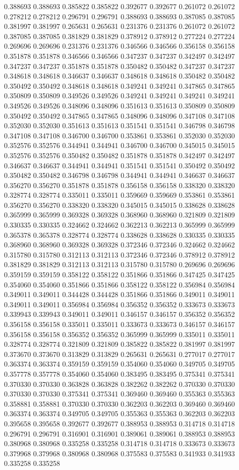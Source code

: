 0.388693 0.388693 0.385822 0.385822 0.392677 0.392677 0.261072 0.261072 0.278212 0.278212 0.296791 0.296791 0.388693 0.388693 0.387085 0.387085 0.381997 0.381997 0.265631 0.265631 0.231376 0.231376 0.261072 0.261072 0.387085 0.387085 0.381829 0.381829 0.378912 0.378912 0.277224 0.277224 0.269696 0.269696 0.231376 0.231376 0.346566 0.346566 0.356158 0.356158 0.351878 0.351878 0.346566 0.346566 0.347237 0.347237 0.342497 0.342497 0.347237 0.347237 0.351878 0.351878 0.350482 0.350482 0.347237 0.347237 0.348618 0.348618 0.346637 0.346637 0.348618 0.348618 0.350482 0.350482 0.350492 0.350492 0.348618 0.348618 0.349241 0.349241 0.347865 0.347865 0.350809 0.350809 0.349526 0.349526 0.349241 0.349241 0.349241 0.349241 0.349526 0.349526 0.348096 0.348096 0.351613 0.351613 0.350809 0.350809 0.350492 0.350492 0.347865 0.347865 0.348096 0.348096 0.347108 0.347108 0.352030 0.352030 0.351613 0.351613 0.351541 0.351541 0.346798 0.346798 0.347108 0.347108 0.346700 0.346700 0.353861 0.353861 0.352030 0.352030 0.352576 0.352576 0.344941 0.344941 0.346700 0.346700 0.345015 0.345015 0.352576 0.352576 0.350482 0.350482 0.351878 0.351878 0.342497 0.342497 0.346637 0.346637 0.344941 0.344941 0.351541 0.351541 0.350492 0.350492 0.350482 0.350482 0.346798 0.346798 0.344941 0.344941 0.346637 0.346637 0.356270 0.356270 0.351878 0.351878 0.356158 0.356158 0.338320 0.338320 0.328774 0.328774 0.335011 0.335011 0.359669 0.359669 0.353861 0.353861 0.356270 0.356270 0.338320 0.338320 0.345015 0.345015 0.338628 0.338628 0.365999 0.365999 0.369328 0.369328 0.368960 0.368960 0.321809 0.321809 0.330335 0.330335 0.324662 0.324662 0.362213 0.362213 0.365999 0.365999 0.365378 0.365378 0.328774 0.328774 0.338628 0.338628 0.330335 0.330335 0.368960 0.368960 0.369328 0.369328 0.372346 0.372346 0.324662 0.324662 0.315780 0.315780 0.312113 0.312113 0.372346 0.372346 0.378912 0.378912 0.381829 0.381829 0.312113 0.312113 0.315780 0.315780 0.269696 0.269696 0.359159 0.359159 0.358122 0.358122 0.351866 0.351866 0.347425 0.347425 0.354060 0.354060 0.351866 0.351866 0.358122 0.358122 0.356984 0.356984 0.349011 0.349011 0.344428 0.344428 0.351866 0.351866 0.349011 0.349011 0.349011 0.349011 0.356984 0.356984 0.356352 0.356352 0.333673 0.333673 0.339943 0.339943 0.349011 0.349011 0.346157 0.346157 0.356352 0.356352 0.356158 0.356158 0.335011 0.335011 0.333673 0.333673 0.346157 0.346157 0.356158 0.356158 0.356352 0.356352 0.365999 0.365999 0.335011 0.335011 0.328774 0.328774 0.321809 0.321809 0.385822 0.385822 0.381997 0.381997 0.373670 0.373670 0.313829 0.313829 0.265631 0.265631 0.277017 0.277017 0.363374 0.363374 0.359159 0.359159 0.354060 0.354060 0.349705 0.349705 0.357778 0.357778 0.354060 0.354060 0.383495 0.383495 0.375341 0.375341 0.370330 0.370330 0.363828 0.363828 0.382262 0.382262 0.370330 0.370330 0.370330 0.370330 0.375341 0.375341 0.369460 0.369460 0.355363 0.355363 0.358881 0.358881 0.370330 0.370330 0.362203 0.362203 0.369460 0.369460 0.363374 0.363374 0.349705 0.349705 0.355363 0.355363 0.362203 0.362203 0.395658 0.395658 0.392677 0.392677 0.388953 0.388953 0.314718 0.314718 0.296791 0.296791 0.316901 0.316901 0.389061 0.389061 0.388953 0.388953 0.380968 0.380968 0.335258 0.335258 0.314718 0.314718 0.333673 0.333673 0.379968 0.379968 0.380968 0.380968 0.375583 0.375583 0.341933 0.341933 0.335258 0.335258 